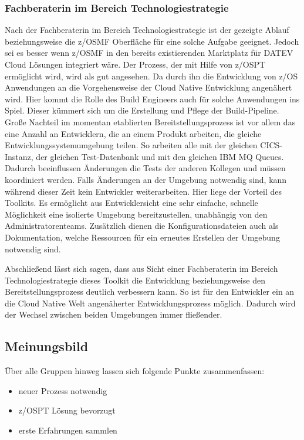\subsubsection{Fachberaterin im Bereich Technologiestrategie}
Nach der Fachberaterin im Bereich Technologiestrategie ist der gezeigte Ablauf beziehungsweise die z/OSMF Oberfläche für eine solche Aufgabe geeignet.
Jedoch sei es besser wenn z/OSMF in den bereits existierenden \glqq Marktplatz\grqq{} für DATEV Cloud Lösungen integriert wäre.
Der Prozess, der mit Hilfe von z/OSPT ermöglicht wird, wird als gut angesehen.
Da durch ihn die Entwicklung von z/OS Anwendungen an die Vorgehensweise der Cloud Native Entwicklung angenähert wird.
Hier kommt die Rolle des Build Engineers auch für solche Anwendungen ins Spiel.
Dieser kümmert sich um die Erstellung und Pflege der Build-Pipeline.
Große Nachteil im momentan etablierten Bereitstellungsprozess ist vor allem das eine Anzahl an Entwicklern, die an einem Produkt arbeiten, die gleiche Entwicklungssystemumgebung teilen.
So arbeiten alle mit der gleichen CICS-Instanz, der gleichen Test-Datenbank und mit den gleichen IBM MQ Queues.
Dadurch beeinflussen Änderungen die Tests der anderen Kollegen und müssen koordiniert werden.
Falls Änderungen an der Umgebung notwendig sind, kann während dieser Zeit kein Entwickler weiterarbeiten.
Hier liege der Vorteil des Toolkits.
Es ermöglicht aus Entwicklersicht eine sehr einfache, schnelle Möglichkeit eine isolierte Umgebung bereitzustellen, unabhängig von den Administratorenteams.
Zusätzlich dienen die Konfigurationsdateien auch als Dokumentation, welche Ressourcen für ein erneutes Erstellen der Umgebung notwendig sind.

Abschließend lässt sich sagen, dass aus Sicht einer Fachberaterin im Bereich Technologiestrategie dieses Toolkit die Entwicklung beziehungsweise den Bereitstellungsprozess deutlich verbessern kann.
So ist für den Entwickler ein an die Cloud Native Welt angenäherter Entwicklungsprozess möglich.
Dadurch wird der Wechsel zwischen beiden Umgebungen immer fließender.

\subsection{Meinungsbild}
Über alle Gruppen hinweg lassen sich folgende Punkte zusammenfassen:

\begin{samepage}
\begin{itemize}
\item neuer Prozess notwendig
\item z/OSPT Lösung bevorzugt
\item erste Erfahrungen sammlen
\end{itemize}
\end{samepage}

